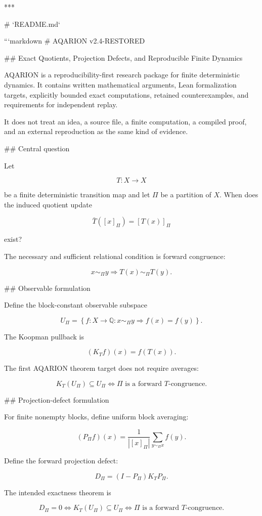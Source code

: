 ***

# `README.md`

```markdown
# AQARION v2.4-RESTORED

## Exact Quotients, Projection Defects, and Reproducible Finite Dynamics

AQARION is a reproducibility-first research package for finite deterministic
dynamics. It contains written mathematical arguments, Lean formalization
targets, explicitly bounded exact computations, retained counterexamples, and
requirements for independent replay.

It does not treat an idea, a source file, a finite computation, a compiled
proof, and an external reproduction as the same kind of evidence.

## Central question

Let

\[
T : X \to X
\]

be a finite deterministic transition map and let \(\Pi\) be a partition of
\(X\). When does the induced quotient update

\[
\bar T([x]_\Pi)=[T(x)]_\Pi
\]

exist?

The necessary and sufficient relational condition is forward congruence:

\[
x\sim_\Pi y
\Longrightarrow
T(x)\sim_\Pi T(y).
\]

## Observable formulation

Define the block-constant observable subspace

\[
U_\Pi
=
\left\{
f:X\to\mathbb Q:
x\sim_\Pi y
\Longrightarrow
f(x)=f(y)
\right\}.
\]

The Koopman pullback is

\[
(K_Tf)(x)=f(T(x)).
\]

The first AQARION theorem target does not require averages:

\[
K_T(U_\Pi)\subseteq U_\Pi
\Longleftrightarrow
\Pi\text{ is a forward }T\text{-congruence}.
\]

## Projection-defect formulation

For finite nonempty blocks, define uniform block averaging:

\[
(P_\Pi f)(x)
=
\frac{1}{|[x]_\Pi|}
\sum_{y\sim_\Pi x}f(y).
\]

Define the forward projection defect:

\[
D_\Pi
=
(I-P_\Pi)K_TP_\Pi.
\]

The intended exactness theorem is

\[
\boxed{
D_\Pi=0
\Longleftrightarrow
K_T(U_\Pi)\subseteq U_\Pi
\Longleftrightarrow
\Pi\text{ is a forward }T\text{-congruence}.
}
\]

